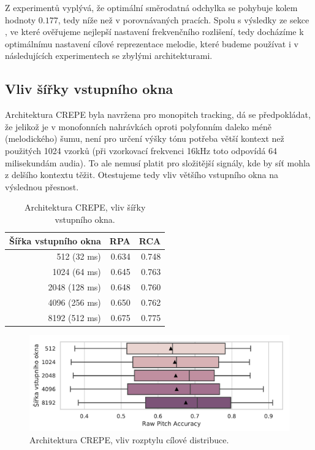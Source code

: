Z experimentů vyplývá, že optimální směrodatná odchylka se pohybuje kolem hodnoty $0.177$, tedy níže než v porovnávaných pracích. Spolu s výsledky ze sekce , ve které ověřujeme nejlepší nastavení frekvenčního rozlišení, tedy docházíme k optimálnímu nastavení cílové reprezentace melodie, které budeme používat i v následujících experimentech se zbylými architekturami.


\subsection{Vliv šířky vstupního okna}

Architektura CREPE byla navržena pro monopitch tracking, dá se předpokládat, že jelikož je v monofonních nahrávkách oproti polyfonním daleko méně (melodického) šumu, není pro určení výšky tónu potřeba větší kontext než použitých 1024 vzorků (při vzorkovací frekvenci 16kHz toto odpovídá 64 milisekundám audia). To ale nemusí platit pro složitější signály, kde by síť mohla z delšího kontextu těžit. Otestujeme tedy vliv většího vstupního okna na výslednou přesnost.


\begin{table}[h!]
\centering
    \begin{tabular}{rrr}
    \toprule
    Šířka vstupního okna &   RPA &   RCA \\
    \midrule
    512 (32 ms)   & 0.634 & 0.748 \\
    1024 (64 ms)  & 0.645 & 0.763 \\
    2048 (128 ms) & 0.648 & 0.760 \\
    4096 (256 ms) & 0.650 & 0.762 \\
    8192 (512 ms) & 0.675 & 0.775 \\
    \bottomrule
    \end{tabular}

\caption{Architektura CREPE, vliv šířky vstupního okna.}\label{tab:crepe_sirka}
\end{table}

\begin{figure}[h]\centering
    \includegraphics[scale=0.6]{../img/figures/crepe_sirka.pdf}
\caption{Architektura CREPE, vliv rozptylu cílové distribuce.}\label{obr:crepe_sirka}
\end{figure}

